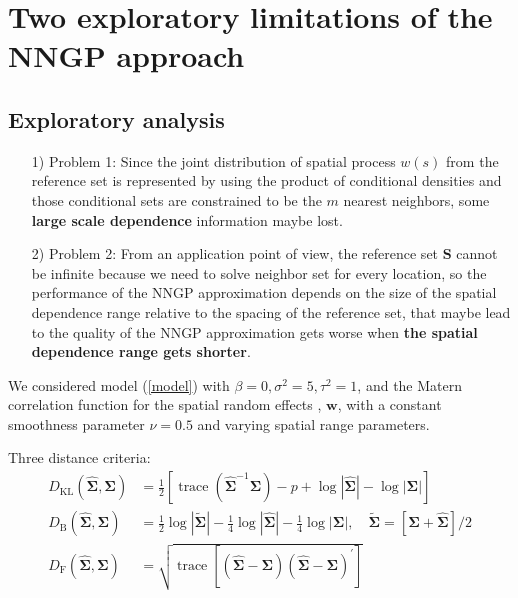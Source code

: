 \documentclass[
12pt, %
a4paper, %
oneside, %
headinclude,footinclude, %
BCOR5mm, %
]{scrartcl}
\begin{document}
\section{Two exploratory limitations of the NNGP approach}
\subsection{Exploratory analysis }
\begin{itemize}
 \item [1)]Problem 1: Since the joint distribution of spatial process $w(s)$ from the reference set is represented by using the product of conditional densities and those conditional sets are constrained to be the $m$ nearest neighbors, some \textbf{large scale dependence} information maybe lost.
 \item [2)]Problem 2: From an application point of view, the reference set $\boldsymbol{S}$ cannot be infinite because we need to solve neighbor set for every location, so the performance of the NNGP approximation depends on the size of the spatial dependence range relative to the spacing of the reference set, that maybe lead to the quality of the NNGP approximation gets worse when \textbf{the spatial dependence range gets shorter}.
\end{itemize}

We considered model (\ref{model}) with $\beta = 0, \sigma^2 = 5, \tau^2 = 1$, and the Matern correlation function for the spatial random effects , $\boldsymbol{w}$, with a constant smoothness parameter $\nu = 0.5$ and varying spatial range parameters.

Three distance criteria:
\begin{align}
D_{\mathrm{KL}}(\hat{\mathbf{\Sigma}}, \mathbf{\Sigma}) &=\frac{1}{2}\left[\operatorname{trace}\left(\hat{\mathbf{\Sigma}}^{-1} \mathbf{\Sigma}\right)- p +\log |\hat{\mathbf{\Sigma}}|-\log |\mathbf{\Sigma}|\right] \\
D_{\mathrm{B}}(\hat{\mathbf{\Sigma}}, \mathbf{\Sigma}) &=\frac{1}{2} \log |\tilde{\mathbf{\Sigma}}|-\frac{1}{4}\log | \hat{\mathbf{\Sigma}} |-\frac{1}{4} \log | \mathbf{\Sigma} |, \quad \tilde{\mathbf{\Sigma}}=[\mathbf{\Sigma}+\hat{\mathbf{\Sigma}}] / 2 \\
D_{\mathrm{F}}(\hat{\mathbf{\Sigma}}, \mathbf{\Sigma}) &=\sqrt{\operatorname{trace}\left[(\hat{\mathbf{\Sigma}}-\mathbf{\Sigma})(\hat{\mathbf{\Sigma}}-\mathbf{\Sigma})^{\prime}\right]}
\end{align}
\end{document}

